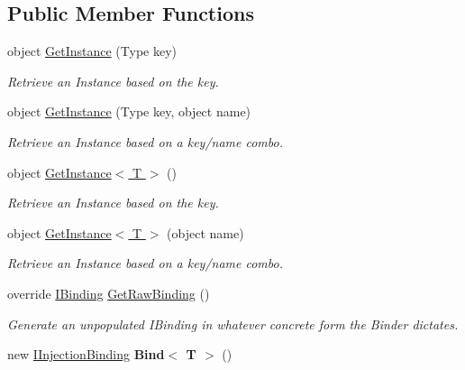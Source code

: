 \subsection*{Public Member Functions}
\begin{DoxyCompactItemize}
\item 
object \hyperlink{classstrange_1_1extensions_1_1injector_1_1impl_1_1_injection_binder_a30a3ddff299d4a86a26e3fd58b4ca68e}{Get\-Instance} (Type key)
\begin{DoxyCompactList}\small\item\em Retrieve an Instance based on the key. \end{DoxyCompactList}\item 
object \hyperlink{classstrange_1_1extensions_1_1injector_1_1impl_1_1_injection_binder_a27b1453d99d77871caf7c0068e211a2f}{Get\-Instance} (Type key, object name)
\begin{DoxyCompactList}\small\item\em Retrieve an Instance based on a key/name combo. \end{DoxyCompactList}\item 
object \hyperlink{classstrange_1_1extensions_1_1injector_1_1impl_1_1_injection_binder_aab0163fc0ce29c87ce23e05b33941550}{Get\-Instance$<$ T $>$} ()
\begin{DoxyCompactList}\small\item\em Retrieve an Instance based on the key. \end{DoxyCompactList}\item 
object \hyperlink{classstrange_1_1extensions_1_1injector_1_1impl_1_1_injection_binder_a1cd9b99f05837f13f0dbc2e47e603faa}{Get\-Instance$<$ T $>$} (object name)
\begin{DoxyCompactList}\small\item\em Retrieve an Instance based on a key/name combo. \end{DoxyCompactList}\item 
\hypertarget{classstrange_1_1extensions_1_1injector_1_1impl_1_1_injection_binder_a06ef3bfc85a8c3cb79a115a7b9247c3e}{override \hyperlink{interfacestrange_1_1framework_1_1api_1_1_i_binding}{I\-Binding} \hyperlink{classstrange_1_1extensions_1_1injector_1_1impl_1_1_injection_binder_a06ef3bfc85a8c3cb79a115a7b9247c3e}{Get\-Raw\-Binding} ()}\label{classstrange_1_1extensions_1_1injector_1_1impl_1_1_injection_binder_a06ef3bfc85a8c3cb79a115a7b9247c3e}

\begin{DoxyCompactList}\small\item\em Generate an unpopulated I\-Binding in whatever concrete form the Binder dictates. \end{DoxyCompactList}\item 
\hypertarget{classstrange_1_1extensions_1_1injector_1_1impl_1_1_injection_binder_a225ef5012c33e46aab59ee7f680a7fc5}{new \hyperlink{interfacestrange_1_1extensions_1_1injector_1_1api_1_1_i_injection_binding}{I\-Injection\-Binding} {\bfseries Bind$<$ T $>$} ()}\label{classstrange_1_1extensions_1_1injector_1_1impl_1_1_injection_binder_a225ef5012c33e46aab59ee7f680a7fc5}


\end{DoxyCompactItemize}
